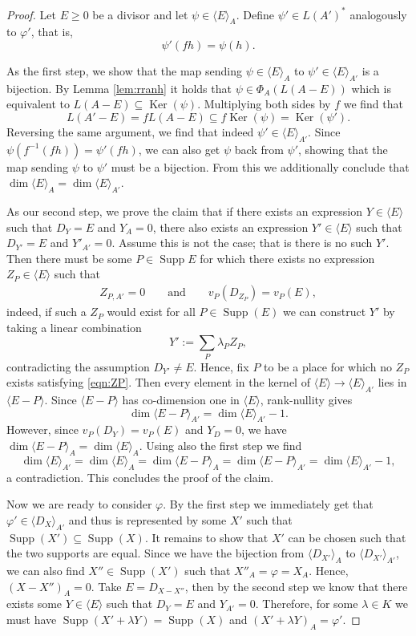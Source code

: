 \documentclass[12pt]{amsart}
\renewcommand{\geq}{\geqslant}
\DeclareMathOperator{\Ker}{Ker}
\DeclareMathOperator{\Supp}{Supp}
\theoremstyle{definition}
\newcommand{\divi}[1]{\langle #1 \rangle}
\begin{document}
	\begin{proof}
		Let $E \geq 0$ be a divisor and let $\psi \in \divi E_A$. Define $\psi' \in L(A')^\ast$ analogously to $\varphi'$, that is,
		$$\psi'(fh)=\psi(h).$$
		
		As the first step, we show that the map sending $\psi\in\divi E_A$ to $\psi'\in\divi E_{A'}$ is a bijection. By Lemma \ref{lem:rranh} it holds that $\psi \in \Phi_A(L(A-E))$ which is equivalent to $L(A-E) \subseteq \Ker(\psi)$. Multiplying both sides by $f$ we find that 
		$$L(A' - E) = fL(A - E) \subseteq f\Ker(\psi) = \Ker(\psi').$$ 
		Reversing the same argument, we find that indeed $\psi' \in \divi E_{A'}$. Since $\psi(f^{-1}(fh)) = \psi'(fh)$, we can also get $\psi$ back from $\psi'$, showing that the map sending $\psi$ to $\psi'$ must be a bijection. From this we additionally conclude that $\dim \divi E_A = \dim \divi E_{A'}$. 
		
		As our second step, we prove the claim that if there exists an expression $Y \in \divi E$ such that $D_Y = E$ and $Y_A = 0$, there also exists an expression $Y' \in \divi E$ such that $D_{Y'} = E$ and $Y'_{A'} = 0$.
		Assume this is not the case; that is there is no such $Y'$. Then there must be some $P \in \Supp E$ for which there exists no expression $Z_P \in \divi E$ such that 
		\begin{align}
			Z_{P, A'} = 0 \qquad\text{and}\qquad v_P(D_{Z_P}) = v_P(E), \label{eqn:ZP}
		\end{align}
		indeed, if such a $Z_P$ would exist for all $P \in \Supp(E)$ we can construct $Y'$ by taking a linear combination 
		$$Y':= \sum_P \lambda_{P }Z_P,$$
		contradicting the assumption $D_{Y'} \neq E$. Hence, fix $P$ to be a place for which no $Z_P$ exists satisfying \eqref{eqn:ZP}. Then every element in the kernel of $\divi E\to \divi E_{A'}$ lies in $\divi{E-P}$. Since $\divi{E-P}$ has co-dimension one in $\divi E$, rank-nullity gives $$\dim \divi {E-P}_{A'}=\dim \divi E_{A'} - 1.$$ However, since  $v_P(D_Y) = v_P(E)$ and $Y_D = 0$, we have $\dim \divi {E-P}_A = \dim \divi E_A$. Using also the first step we find
		$$\dim \divi E_{A'} = \dim \divi E_A = \dim \divi {E - P}_A = \dim \divi {E-P}_{A'} = \dim \divi E_{A'} - 1,$$
		a contradiction. This concludes the proof of the claim. 
		
		Now we are ready to consider $\varphi$. By the first step we immediately get that $\varphi' \in \divi {D_X}_{A'}$ and thus is represented by some $X'$ such that $\Supp(X') \subseteq \Supp(X)$. It remains to show that $X'$ can be chosen such that the two supports are equal. Since we have the bijection from $\divi {D_{X'}}_A$ to $\divi {D_{X'}}_{A'}$, we can also find $X'' \in \Supp(X')$ such that $X''_{A} = \varphi = X_A.$ Hence, $(X - X'')_A = 0$. Take $E = D_{X - X''}$, then by the second step we know that there exists some $Y \in \divi E$ such that $D_Y = E$ and $Y_{A'} = 0$. Therefore, for some $\lambda \in K$ we must have $\Supp(X' + \lambda Y) = \Supp(X)$ and $(X' + \lambda Y)_A = \varphi'$. 
	\end{proof}
	
\end{document}
